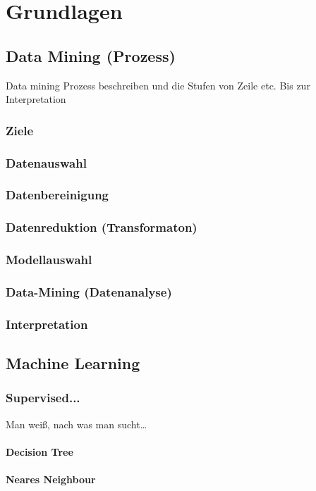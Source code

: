 \chapter{Grundlagen}

\section{Data Mining (Prozess)}
Data mining Prozess beschreiben und die Stufen von Zeile etc. Bis zur Interpretation 
\subsection{Ziele}
\subsection{Datenauswahl}
\subsection{Datenbereinigung}
\subsection{Datenreduktion (Transformaton)}
\subsection{Modellauswahl}
\subsection{Data-Mining (Datenanalyse)}
\subsection{Interpretation}
\section{Machine Learning } 
\subsection{Supervised...}
Man weiß, nach was man sucht…
\subsubsection{Decision Tree}
\subsubsection{Neares Neighbour}
